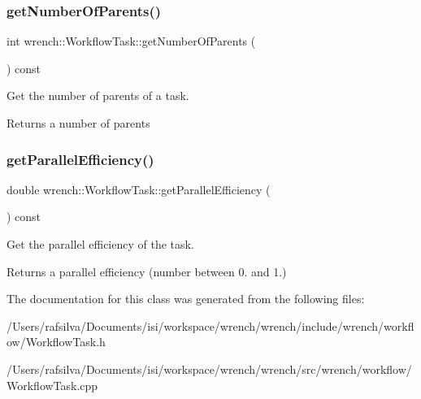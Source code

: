 \subsubsection{\texorpdfstring{get\+Number\+Of\+Parents()}{getNumberOfParents()}}
{\footnotesize\ttfamily int wrench\+::\+Workflow\+Task\+::get\+Number\+Of\+Parents (\begin{DoxyParamCaption}{ }\end{DoxyParamCaption}) const}



Get the number of parents of a task. 

\begin{DoxyReturn}{Returns}
a number of parents 
\end{DoxyReturn}
\mbox{\label{classwrench_1_1_workflow_task_ab7e3113ba73aebc6e2776a6e56984662}} 
\subsubsection{\texorpdfstring{get\+Parallel\+Efficiency()}{getParallelEfficiency()}}
{\footnotesize\ttfamily double wrench\+::\+Workflow\+Task\+::get\+Parallel\+Efficiency (\begin{DoxyParamCaption}{ }\end{DoxyParamCaption}) const}



Get the parallel efficiency of the task. 

\begin{DoxyReturn}{Returns}
a parallel efficiency (number between 0. and 1.) 
\end{DoxyReturn}


The documentation for this class was generated from the following files\+:\begin{DoxyCompactItemize}
\item 
/\+Users/rafsilva/\+Documents/isi/workspace/wrench/wrench/include/wrench/workflow/Workflow\+Task.\+h\item 
/\+Users/rafsilva/\+Documents/isi/workspace/wrench/wrench/src/wrench/workflow/Workflow\+Task.\+cpp\end{DoxyCompactItemize}
